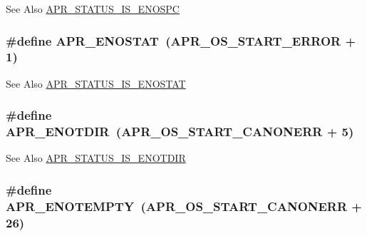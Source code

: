 \begin{DoxySeeAlso}{See Also}
\hyperlink{group___a_p_r___s_t_a_t_u_s___i_s_ga5c77e7bb1de1b6ec319f2a42eb80be1e}{A\-P\-R\-\_\-\-S\-T\-A\-T\-U\-S\-\_\-\-I\-S\-\_\-\-E\-N\-O\-S\-P\-C} 
\end{DoxySeeAlso}
\hypertarget{group___a_p_r___error_ga7995805cf68be1fb16f684c544e45fbe}{
\subsubsection[{A\-P\-R\-\_\-\-E\-N\-O\-S\-T\-A\-T}]{\setlength{\rightskip}{0pt plus 5cm}\#define A\-P\-R\-\_\-\-E\-N\-O\-S\-T\-A\-T~({\bf A\-P\-R\-\_\-\-O\-S\-\_\-\-S\-T\-A\-R\-T\-\_\-\-E\-R\-R\-O\-R} + 1)}}\label{group___a_p_r___error_ga7995805cf68be1fb16f684c544e45fbe}
\begin{DoxySeeAlso}{See Also}
\hyperlink{group___a_p_r___s_t_a_t_u_s___i_s_ga1f0d21900aa879ca4866b1bf846cfd0d}{A\-P\-R\-\_\-\-S\-T\-A\-T\-U\-S\-\_\-\-I\-S\-\_\-\-E\-N\-O\-S\-T\-A\-T} 
\end{DoxySeeAlso}
\hypertarget{group___a_p_r___error_gacfaa73cea75d14d49cc5c81e6c494330}{
\subsubsection[{A\-P\-R\-\_\-\-E\-N\-O\-T\-D\-I\-R}]{\setlength{\rightskip}{0pt plus 5cm}\#define A\-P\-R\-\_\-\-E\-N\-O\-T\-D\-I\-R~({\bf A\-P\-R\-\_\-\-O\-S\-\_\-\-S\-T\-A\-R\-T\-\_\-\-C\-A\-N\-O\-N\-E\-R\-R} + 5)}}\label{group___a_p_r___error_gacfaa73cea75d14d49cc5c81e6c494330}
\begin{DoxySeeAlso}{See Also}
\hyperlink{group___a_p_r___s_t_a_t_u_s___i_s_gace6923483aa351b05b8f41e0bdb1df60}{A\-P\-R\-\_\-\-S\-T\-A\-T\-U\-S\-\_\-\-I\-S\-\_\-\-E\-N\-O\-T\-D\-I\-R} 
\end{DoxySeeAlso}
\hypertarget{group___a_p_r___error_ga01d9259eccdf0576f58b89c4ad8ca4eb}{
\subsubsection[{A\-P\-R\-\_\-\-E\-N\-O\-T\-E\-M\-P\-T\-Y}]{\setlength{\rightskip}{0pt plus 5cm}\#define A\-P\-R\-\_\-\-E\-N\-O\-T\-E\-M\-P\-T\-Y~({\bf A\-P\-R\-\_\-\-O\-S\-\_\-\-S\-T\-A\-R\-T\-\_\-\-C\-A\-N\-O\-N\-E\-R\-R} + 26)}}\label{group___a_p_r___error_ga01d9259eccdf0576f58b89c4ad8ca4eb}
